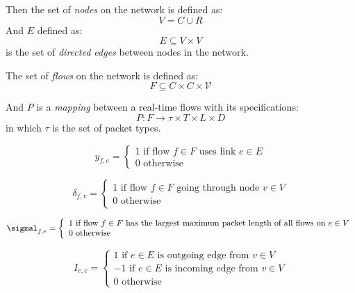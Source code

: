 \documentclass[conference, twocolumn]{IEEEtran}
\theoremstyle{definition}
\begin{document}
Then the set of {\em nodes} on the network is defined as:
\begin{equation}\label{reio}
V = C \cup R
\end{equation}
And $E$ defined as:
\begin{equation}
E \subseteq V \times V 
\end{equation}
is the set of {\em directed edges} between nodes in the network.

The set of {\em flows} on the network is defined as:
\begin{equation}
F \subseteq C \times C \times \mathcal{V} 
\end{equation}

And $P$ is a {\em mapping } between a real-time flows with its specifications:
\begin{equation}
P:F \rightarrow \tau \times T \times L \times D
\end{equation}
in which $\tau$ is the set of packet types.

\begin{equation}
y_{f,e} = \left\{ \begin{array}{lrc}
1 \mbox{ if flow } f \in F \mbox{ uses link } e \in E \\
0 \mbox{ otherwise} 
\end{array}\right.
\end{equation}

\begin{equation}
\delta_{f,v} = \left\{ \begin{array}{lrc}
1 \mbox{ if flow } f \in F \mbox{ going through node } v \in V \\
0 \mbox{ otherwise} 
\end{array}\right.
\end{equation}

\begin{equation}
\sigmal_{f,e} = \left\{ \begin{array}{lrc}
1 \mbox{ if flow } f \in F \mbox{ has the largest maximum packet length of all
flows on } e \in V \\ 
0 \mbox{ otherwise} 
\end{array}\right.
\end{equation}

\begin{equation}
I_{v,e} = \left\{ \begin{array}{lrc}
1 \mbox{ if } e \in E \mbox{ is outgoing edge from } v \in V \\
-1 \mbox{ if } e \in E \mbox{ is incoming edge from } v \in V \\
0 \mbox{ otherwise}
\end{array}\right. 
\end{equation}
\end{document}

